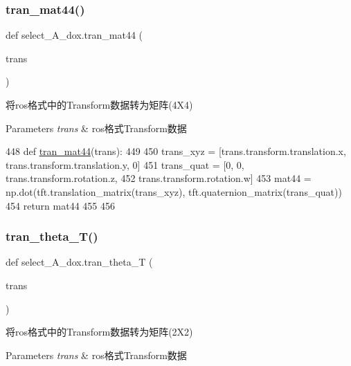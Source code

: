 \subsubsection{\texorpdfstring{tran\+\_\+mat44()}{tran\_mat44()}}
{\footnotesize\ttfamily def select\+\_\+\+A\+\_\+dox.\+tran\+\_\+mat44 (\begin{DoxyParamCaption}\item[{}]{trans }\end{DoxyParamCaption})}



将ros格式中的\+Transform数据转为矩阵(4\+X4) 


\begin{DoxyParams}{Parameters}
{\em trans} & ros格式\+Transform数据 \\
\hline
\end{DoxyParams}

\begin{DoxyCode}
448 \textcolor{keyword}{def }\hyperlink{namespaceselect___a__dox_ac19f6260515ad57d2a375614405ec33d}{tran\_mat44}(trans):
449 
450     trans\_xyz = [trans.transform.translation.x, trans.transform.translation.y, 0]
451     trans\_quat = [0, 0, trans.transform.rotation.z,
452                   trans.transform.rotation.w]
453     mat44 = np.dot(tft.translation\_matrix(trans\_xyz), tft.quaternion\_matrix(trans\_quat))
454     \textcolor{keywordflow}{return} mat44
455 
456 
\end{DoxyCode}
\mbox{\label{namespaceselect___a__dox_a62a8e3ea1a92df75e0ca42190f621777}} 
\subsubsection{\texorpdfstring{tran\+\_\+theta\+\_\+\+T()}{tran\_theta\_T()}}
{\footnotesize\ttfamily def select\+\_\+\+A\+\_\+dox.\+tran\+\_\+theta\+\_\+T (\begin{DoxyParamCaption}\item[{}]{trans }\end{DoxyParamCaption})}



将ros格式中的\+Transform数据转为矩阵(2\+X2) 


\begin{DoxyParams}{Parameters}
{\em trans} & ros格式\+Transform数据 \\
\hline
\end{DoxyParams}

